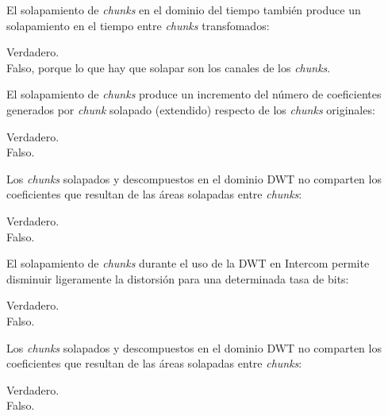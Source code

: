 \documentclass[legalpaper, 12pt, addpoints]{exam}
\begin{document}
\begin{questions}
\vspace{0.10in}

\question El solapamiento de \emph{chunks} en el dominio del tiempo
también produce un solapamiento en el tiempo entre \emph{chunks}
transfomados:

\begin{oneparchoices}
  \choice Verdadero.\\
  \choice Falso, porque lo que hay que solapar son los canales de los \emph{chunks}.
\end{oneparchoices}
  
\vspace{0.10in}

\question El solapamiento de \emph{chunks} produce un incremento del
número de coeficientes generados por \emph{chunk} solapado (extendido)
respecto de los \emph{chunks} originales:

\begin{oneparchoices}
  \choice Verdadero.\\
  \choice Falso.
\end{oneparchoices}
  
\vspace{0.10in}

\question Los \emph{chunks} solapados y descompuestos en el dominio
DWT no comparten los coeficientes que resultan de las áreas solapadas
entre \emph{chunks}:

\begin{oneparchoices}
  \choice Verdadero.\\
  \choice Falso.
\end{oneparchoices}
  
\vspace{0.10in}

\question El solapamiento de \emph{chunks} durante el uso de la DWT en
Intercom permite disminuir ligeramente la distorsión para una
determinada tasa de bits:

\begin{oneparchoices}
  \choice Verdadero.\\
  \choice Falso.
\end{oneparchoices}
  
\vspace{0.10in}

\question Los \emph{chunks} solapados y descompuestos en el dominio
DWT no comparten los coeficientes que resultan de las áreas solapadas
entre \emph{chunks}:

\begin{oneparchoices}
  \choice Verdadero.\\
  \choice Falso.
\end{oneparchoices}
  

\end{questions}
\end{document}
